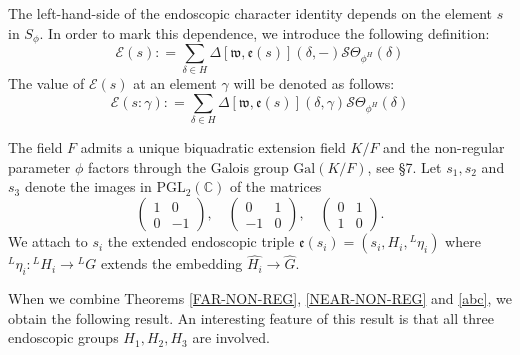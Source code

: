 \documentclass[11pt]{amsart}
\numberwithin{equation}{section}
\def\fe{\mathfrak{e}}
\def\fw{\mathfrak{w}}
\def\Gal{\mathrm{Gal}}
\def\PGL{\mathrm{PGL}}
\def\C{\mathbb{C}}
\newcommand{\sS}{\mathscr{S}}
\newcommand{\<}{\left\langle}
\renewcommand{\>}{\right\rangle}
\begin{document}
The left-hand-side of the endoscopic character identity depends on the element $s$ in $S_\phi$.    In order to mark this dependence, we introduce the following definition:  
\[
\mathscr{E}(s): =  \sum_{\delta \in H}  \Delta[\fw, \fe(s)](\delta, -) \sS\Theta_{\phi^{H}} (\delta) 
\]
The value of $\mathscr{E}(s)$ at an element $\gamma$ will be denoted as follows: 
\[
\mathscr{E}(s:\gamma): =  \sum_{\delta \in H}  \Delta[\fw, \fe(s)](\delta, \gamma) \sS\Theta_{\phi^{H}} (\delta) 
\]


The field $F$ admits a unique biquadratic extension field $K/F$ and the non-regular parameter $\phi$ factors through the Galois group $\Gal(K/F)$, see \S7.    Let $s_1, s_2$ and $s_3$ denote the images in $\PGL_2(\C)$ of the matrices
\[
\left(\begin{matrix}1&0\\0&-1\end{matrix}\right), \quad \left(\begin{matrix}0&1\\-1&0\end{matrix}\right),  \quad   \left(\begin{matrix}0&1\\1&0\end{matrix}\right).
\] 
We attach to $s_i$ the extended endoscopic 
triple $\fe(s_i) = (s_i, H_i, {}^L\eta_i)$ where ${}^L\eta_i : {}^LH_i \to {}^LG$ extends the embedding $\widehat{H_i} \to \widehat{G}$.      


  When we combine Theorems \ref{FAR-NON-REG}, 
\ref{NEAR-NON-REG}  and  \ref{abc}, we obtain the following result.   An interesting feature of this result is that all three endoscopic groups $H_1, H_2, H_3$ are involved.   
\end{document}
